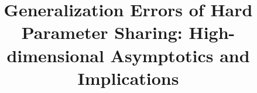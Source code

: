 \documentclass{article}
\begin{document}
\title{Generalization Errors of Hard Parameter Sharing: High-dimensional Asymptotics and Implications}
\maketitle






%
%
%



\appendix






\end{document}
